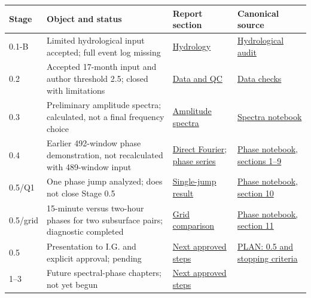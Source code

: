 \documentclass[11pt,letterpaper]{article}
\begin{document}
\begingroup
\footnotesize
\setlength{\tabcolsep}{2.8pt}
\renewcommand{\arraystretch}{1.13}
\begin{longtable}{@{}p{1.28cm}p{4.0cm}p{3.35cm}p{5.05cm}@{}}
\toprule
Stage & Object and status & Report section & Canonical source\\
\midrule
0.1-B & Limited hydrological input accepted; full event log missing
& \hyperref[sec:hydro]{Hydrology}
& \href{https://github.com/DimitriBolt/CO2Flux/blob/main/Project_description/Research_log/details/00_irrigation_audit.md#stage01b-pilot-input}{Hydrological audit}\\
0.2 & Accepted 17-month input and author threshold 2.5; closed with limitations
& \hyperref[sec:data]{Data and QC}
& \href{https://github.com/DimitriBolt/CO2Flux/blob/main/Project_description/Research_log/details/02_data_checks.md}{Data checks}\\
0.3 & Preliminary amplitude spectra; calculated, not a final frequency choice
& \hyperref[sec:gls]{Amplitude spectra}
& \href{https://github.com/DimitriBolt/CO2Flux/blob/main/Project_description/Research_log/00_preliminary_co2_spectra.ipynb}{Spectra notebook}\\
0.4 & Earlier 492-window phase demonstration, not recalculated with 489-window input
& \hyperref[sec:fourier]{Direct Fourier}; \hyperref[sec:phase-results]{phase series}
& \href{https://github.com/DimitriBolt/CO2Flux/blob/main/Project_description/Research_log/00_preliminary_fourier_phases.ipynb}{Phase notebook, sections 1--9}\\
0.5/Q1 & One phase jump analyzed; does not close Stage 0.5
& \hyperref[sec:jump]{Single-jump result}
& \href{https://github.com/DimitriBolt/CO2Flux/blob/main/Project_description/Research_log/00_preliminary_fourier_phases.ipynb#one-phase-jump}{Phase notebook, section 10}\\
0.5/grid & 15-minute versus two-hour phases for two subsurface pairs; diagnostic completed
& \hyperref[sec:gridstudy]{Grid comparison}
& \href{https://github.com/DimitriBolt/CO2Flux/blob/main/Project_description/Research_log/00_preliminary_fourier_phases.ipynb#temporal-grid-resolution}{Phase notebook, section 11}\\
0.5 & Presentation to I.G. and explicit approval; pending
& \hyperref[sec:next]{Next approved steps}
& \href{https://github.com/DimitriBolt/CO2Flux/blob/main/Project_description/Research_log/PLAN.md#preparation}{PLAN: 0.5 and stopping criteria}\\
1--3 & Future spectral-phase chapters; not yet begun
& \hyperref[sec:next]{Next approved steps}

\end{longtable}
\end{document}
